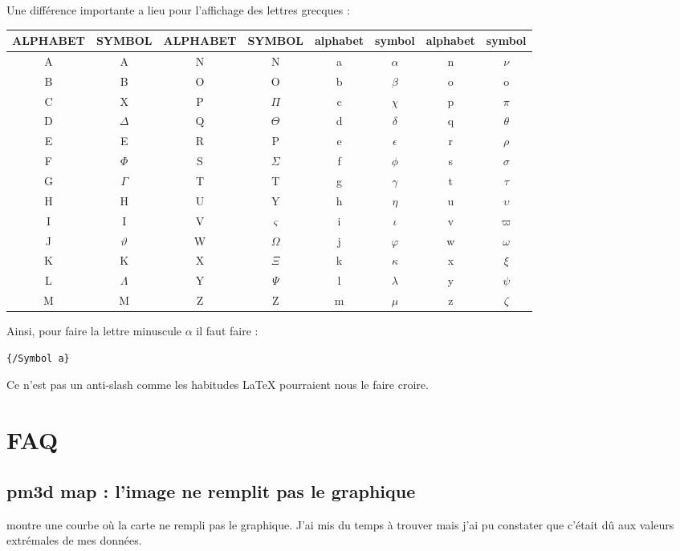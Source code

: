 \documentclass[a4paper,twoside]{article}
\begin{document}
\bigskip

Une différence importante a lieu pour l'affichage des lettres grecques : 
\begin{center}
\begin{tabular}{*{4}{|c|c|}}
\hline
ALPHABET  & SYMBOL  & ALPHABET  & SYMBOL  & alphabet  & symbol  & alphabet  & symbol \\\hline\hline
A  & A  & N  & N  & a  & $\alpha$  & n  & $\nu$\\\hline
B  & B  & O  & O  & b  & $\beta$  & o  & o\\\hline
C  & X  & P  & $\Pi$  & c  & $\chi$  & p  & $\pi$\\\hline
D  & $\Delta$  & Q  & $\Theta$  & d  & $\delta$  & q  & $\theta$\\\hline
E  & E  & R  & P  & e  & $\epsilon$  & r  & $\rho$\\\hline
F  & $\Phi$  & S  & $\Sigma$  & f  & $\phi$  & s  & $\sigma$\\\hline
G  & $\Gamma$  & T  & T  & g  & $\gamma$  & t  & $\tau$\\\hline
H  & H  & U  & Y  & h  & $\eta$  & u  & $\upsilon$\\\hline
I  & I  & V  & $\varsigma$  & i  & $\iota$  & v & $\varpi$\\\hline
J & $\vartheta$ & W  & $\Omega$ & j & $\varphi$ & w  & $\omega$\\\hline
K  & K  & X  & $\Xi$  & k  & $\kappa$  & x  & $\xi$\\\hline
L  & $\Lambda$  & Y  & $\Psi$  & l  & $\lambda$  & y  & $\psi$\\\hline
M  & M  & Z  & Z  & m  & $\mu$  & z  & $\zeta $\\\hline
\end{tabular}
\end{center}

Ainsi, pour faire la lettre minuscule $\alpha$ il faut faire : 
\begin{verbatim}
{/Symbol a}
\end{verbatim}

\begin{attention}
Ce n'est pas un anti-slash comme les habitudes \LaTeX{} pourraient nous le faire croire.
\end{attention}

\section{FAQ}
\subsection{pm3d map : l'image ne remplit pas le graphique}
 montre une courbe où la carte ne rempli pas le graphique. J'ai mis du temps à trouver mais j'ai pu constater que c'était dû aux valeurs extrémales de mes données. 
\end{document}
